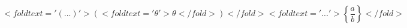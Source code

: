 \[
    <fold text='(...)'>\left( <fold text='θ'>\theta</fold> \right)</fold>
    <fold text='{...}'>\left\{ \frac a b \right\}</fold>
\]